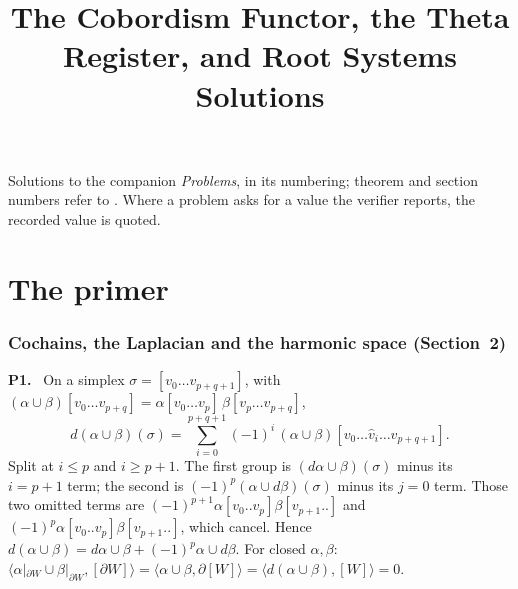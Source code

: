 \documentclass[11pt]{article}
\title{The Cobordism Functor, the Theta Register, and Root Systems\\[4pt]
\large Solutions}
\author{}
\date{}
\newenvironment{solution}[1]{\medskip\noindent\textbf{P#1.}\ }{\par\medskip}
\begin{document}
\maketitle

Solutions to the companion \emph{Problems}, in its numbering; theorem and
section numbers refer to .
Where a problem asks for a value the verifier reports, the recorded value is
quoted.

\part*{The primer}

\section*{Cochains, the Laplacian and the harmonic space (Section~2)}

\begin{solution}{1}
On a simplex $\sigma = [v_0\dots v_{p+q+1}]$, with $(\alpha\cup\beta)[v_0\dots v_{p+q}]
= \alpha[v_0\dots v_p]\,\beta[v_p\dots v_{p+q}]$,
\[
  d(\alpha\cup\beta)(\sigma) = \sum_{i=0}^{p+q+1}(-1)^i\,(\alpha\cup\beta)[v_0\dots\hat v_i\dots v_{p+q+1}].
\]
Split at $i\le p$ and $i\ge p+1$. The first group is $(d\alpha\cup\beta)(\sigma)$
minus its $i=p+1$ term; the second is $(-1)^p(\alpha\cup d\beta)(\sigma)$ minus
its $j=0$ term. Those two omitted terms are $(-1)^{p+1}\alpha[v_0..v_p]\beta[v_{p+1}..]$
and $(-1)^p\alpha[v_0..v_p]\beta[v_{p+1}..]$, which cancel. Hence
$d(\alpha\cup\beta) = d\alpha\cup\beta + (-1)^p\alpha\cup d\beta$. For closed
$\alpha,\beta$: $\langle\alpha|_{\partial W}\cup\beta|_{\partial W},[\partial W]\rangle
= \langle\alpha\cup\beta,\partial[W]\rangle = \langle d(\alpha\cup\beta),[W]\rangle = 0$.
\end{solution}
\end{document}
